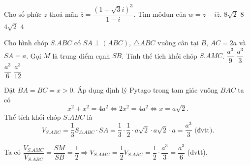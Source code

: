 \begin{ex}%
Cho số phức $z$  thoả mãn $\overline{z}=\dfrac{(1-\sqrt{3}i)^3}{1-i}$. Tìm môđun của $w=z-i \overline{z}$.
\choice
{\True $8\sqrt{2}$}
{$8$}
{$4\sqrt{2}$}
{$4$}
\end{ex}
\begin{ex}%
	Cho hình chóp $S.ABC$ có $SA \perp (ABC)$, $\triangle ABC$ vuông cân tại $B$, $AC=2a$ và $SA=a$. Gọi $M$ là trung điểm cạnh $SB$. Tính thể tích khối chóp $S.AMC$.
	\choice
	{$\dfrac{a^3}{9}$}
	{$\dfrac{a^3}{3}$}
	{\True $\dfrac{a^3}{6}$}
	{$\dfrac{a^3}{12}$}
	\loigiai 
	{
		\immini
		{
			Đặt $BA=BC=x>0$. Áp dụng định lý Pytago trong tam giác vuông $BAC$ ta có \[x^2+x^2=4a^2 \Leftrightarrow 2x^2=4a^2 \Leftrightarrow x = a\sqrt{2}.\]
			Thể tích khối chóp $S.ABC$ là 
			\[V_{S.ABC} = \dfrac{1}{3} S_{\triangle ABC} \cdot SA = \dfrac{1}{3} \cdot \dfrac{1}{2} \cdot a\sqrt{2} \cdot a\sqrt{2} \cdot a = \dfrac{a^3}{3} \text{ (đvtt).}\]
			
		}
		{
		}	
	\noindent Ta có $\dfrac{V_{S.AMC}}{V_{S.ABC}} = \dfrac{SM}{SB} = \dfrac{1}{2} \Rightarrow V_{S.AMC} = \dfrac{1}{2}V_{S.ABC} = \dfrac{1}{2} \cdot \dfrac{a^3}{3} = \dfrac{a^3}{6}$ (đvtt).
	}
\end{ex}

